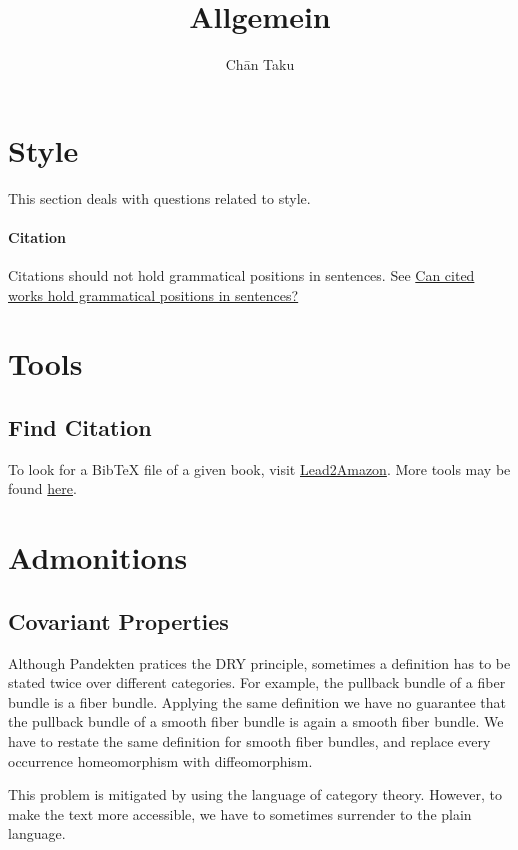 \documentclass{article}
\title{Allgemein}
\author{Ch\=an Taku}
\begin{document}
\maketitle

\section{Style}

This section deals with questions related to style.

\paragraph{Citation}
Citations should not hold grammatical positions in sentences.
See \href{https://academia.stackexchange.com/questions/49487/can-cited-works-hold-grammatical-positions-in-sentences}{Can cited works hold grammatical positions in sentences?}

\section{Tools}

\subsection{Find Citation}

To look for a BibTeX file of a given book, visit \href{https://lead.to/amazon/com/?key=978-0199566402&si=al&bn=&la=en&cu=usd&op=bt&so=re#first}{Lead2Amazon}.
More tools may be found \href{https://tex.stackexchange.com/questions/58200/what-is-the-best-way-to-get-bibtex-entries-from-isbn-number}{here}.

\section{Admonitions}

\subsection{Covariant Properties}

Although Pandekten pratices the DRY principle,
sometimes a definition has to be stated twice over different categories.
For example, the pullback bundle of a fiber bundle is a fiber bundle.
Applying the same definition we have no guarantee that the pullback bundle of a smooth fiber bundle is again a smooth fiber bundle.
We have to restate the same definition for smooth fiber bundles, and replace every occurrence homeomorphism with diffeomorphism.
\par
This problem is mitigated by using the language of category theory.
However, to make the text more accessible, we have to sometimes surrender to the plain language.
\end{document}
